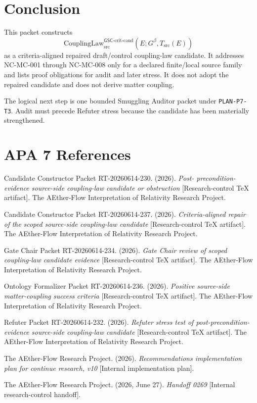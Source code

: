 \documentclass[11pt]{article}
\newcommand{\Gbeta}{G^\beta}
\newcommand{\CouplingLawCrit}{\mathrm{CouplingLaw}^{\mathsf{GSC}\mbox{-}\mathrm{crit}\mbox{-}\mathrm{cand}}_{\mathrm{src}}}
\begin{document}
\section{Conclusion}

This packet constructs
\[
  \CouplingLawCrit(E;\Gbeta,T_{\mathrm{src}}(E))
\]
as a criteria-aligned repaired draft/control coupling-law candidate. It
addresses NC-MC-001 through NC-MC-008 only for a declared finite/local source
family and lists proof obligations for audit and later stress. It does not
adopt the repaired candidate and does not derive matter coupling.

The logical next step is one bounded Smuggling Auditor packet under
\texttt{PLAN-P7-T3}. Audit must precede Refuter stress because the candidate
has been materially strengthened.

\section{APA 7 References}

Candidate Constructor Packet RT-20260614-230. (2026). \emph{Post-
precondition-evidence source-side coupling-law candidate or obstruction}
[Research-control TeX artifact]. The AEther-Flow Interpretation of Relativity
Research Project.

Candidate Constructor Packet RT-20260614-237. (2026). \emph{Criteria-aligned
repair of the scoped source-side coupling-law candidate} [Research-control
TeX artifact]. The AEther-Flow Interpretation of Relativity Research Project.

Gate Chair Packet RT-20260614-234. (2026). \emph{Gate Chair review of scoped
coupling-law candidate evidence} [Research-control TeX artifact]. The
AEther-Flow Interpretation of Relativity Research Project.

Ontology Formalizer Packet RT-20260614-236. (2026). \emph{Positive
source-side matter-coupling success criteria} [Research-control TeX artifact].
The AEther-Flow Interpretation of Relativity Research Project.

Refuter Packet RT-20260614-232. (2026). \emph{Refuter stress test of
post-precondition-evidence source-side coupling-law candidate}
[Research-control TeX artifact]. The AEther-Flow Interpretation of Relativity
Research Project.

The AEther-Flow Research Project. (2026). \emph{Recommendations implementation
plan for continue research, v10} [Internal implementation plan].

The AEther-Flow Research Project. (2026, June 27). \emph{Handoff 0269}
[Internal research-control handoff].
\end{document}
